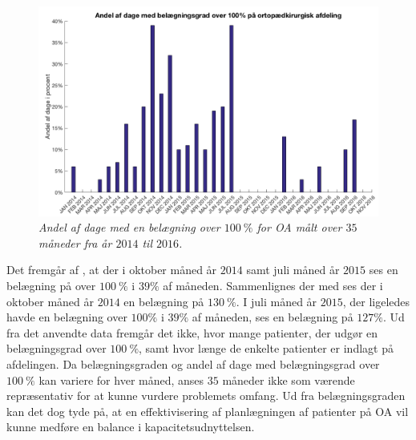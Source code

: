 \begin{figure}[H]
	\flushleft 
	\centering
	\includegraphics[scale=.35]{figures/andelAfDage.png}
	\flushleft
	\caption{\textit{Andel af dage med en belægning over $100~\%$ for OA målt over $35$ måneder fra år $2014$ til $2016$.}\cite{SDS2015}}
	\label{andeldage}
\end{figure}

\noindent
Det fremgår af , at der i oktober måned år $2014$ samt juli måned år $2015$ ses en belægning på over $100~\%$ i $39\%$ af måneden. Sammenlignes der med  ses der i oktober måned år $2014$ en belægning på $130~\%$. I juli måned år $2015$, der ligeledes havde en belægning over $100\%$ i $39\%$ af måneden, ses en belægning på $127\%$. 
Ud fra det anvendte data fremgår det ikke, hvor mange patienter, der udgør en belægningsgrad over $100~\%$, samt hvor længe de enkelte patienter er indlagt på afdelingen. Da belægningsgraden og andel af dage med belægningsgrad over $100~\%$ kan variere for hver måned, anses $35$ måneder ikke som værende repræsentativ for at kunne vurdere problemets omfang. Ud fra belægningsgraden kan det dog tyde på, at en effektivisering af planlægningen af patienter på OA vil kunne medføre en balance i kapacitetsudnyttelsen.
